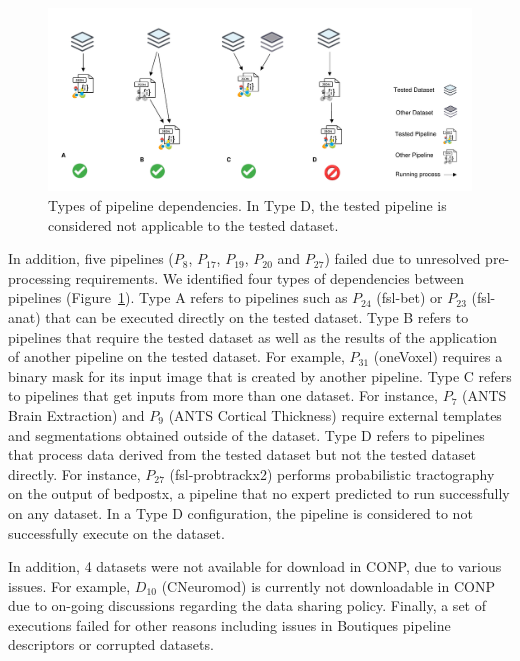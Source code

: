 \documentclass[conference]{IEEEtran}
\begin{document}
\begin{figure}[hbt!]
\centering%
\includegraphics[width=\textwidth]{figures/Pipeline dependencies.pdf}
\caption{Types of pipeline dependencies. In Type D, the tested pipeline 
is considered not applicable to the tested dataset.}
\label{fig:pipeline_dependencies}
\end{figure}
In addition, five pipelines ($P_{8}$, $P_{17}$, $P_{19}$, $P_{20}$ and
$P_{27}$) failed due to unresolved pre-processing requirements. We
identified four types of dependencies between pipelines
(Figure~\ref{fig:pipeline_dependencies}). Type A refers to pipelines such
as $P_{24}$ (fsl-bet) or $P_{23}$ (fsl-anat) that can be executed directly
on the tested dataset. Type B refers to pipelines that require the tested
dataset as well as the results of the application of another pipeline on
the tested dataset. For example, $P_{31}$ (oneVoxel) requires a binary mask
for its input image that is created by another pipeline. Type C refers
to pipelines that get inputs from more than one dataset. For instance, $P_7$
(ANTS Brain Extraction) and $P_9$ (ANTS Cortical Thickness) require
external templates and segmentations obtained outside of the dataset. Type
D refers to pipelines that process data derived from the tested dataset but not
the tested dataset directly.  For instance, $P_{27}$ (fsl-probtrackx2) performs
probabilistic tractography on the output of bedpostx, a pipeline that
no expert predicted to run successfully on any dataset. In a Type D
configuration, the pipeline is considered to not successfully execute on
the dataset. 

In addition, 4 datasets were not available for download in CONP, due to
various issues. For example, $D_{10}$ (CNeuromod) is currently not
downloadable in CONP due to on-going discussions regarding the data sharing policy.
Finally, a set of executions failed for other reasons including issues in
Boutiques pipeline descriptors or corrupted datasets.
\end{document}
